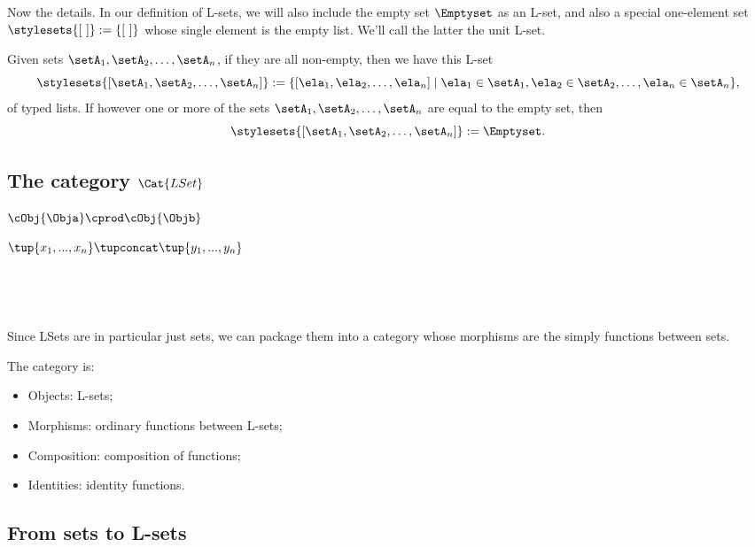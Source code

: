 Now the details.
In our definition of L-sets, we will also include the empty set $\Emptyset$ as an L-set, and also a special one-element set $\stylesets{[ \ ]} := \{ [ \ ] \}$ whose single element is the empty list.
We'll call the latter the unit L-set.

Given sets $\setA_1, \setA_2, \dots , \setA_n$, if they are all non-empty, then we have this L-set
\begin{equation}
    \stylesets{[\setA_1, \setA_2, \dots, \setA_n]} := \{ [ \ela_1, \ela_2, \dots, \ela_n] \mid \ela_1 \in \setA_1, \ela_2 \in \setA_2, \dots, \ela_n \in \setA_n \},
\end{equation}
of typed lists.
If however one or more of the sets $\setA_1, \setA_2, \dots , \setA_n$ are equal to the empty set, then \begin{equation}
    \stylesets{[\setA_1, \setA_2, \dots, \setA_n]} := \Emptyset.
\end{equation}

\subsection{The category $\Cat{LSet}$}

\cCat{\Set}

$\cObj{\Obja} \cprod \cObj{\Objb}$

$\tup{x_1, ..., x_n} \tupconcat \tup{y_1, ..., y_n}$

\

\

Since LSets are in particular just sets, we can package them into a category whose morphisms are the simply functions between sets.

\begin{ctdefinition}
    The category  is:

    \begin{itemize}
        \item Objects: L-sets;
        \item Morphisms: ordinary functions between L-sets;
        \item Composition: composition of functions;
        \item Identities: identity functions.
    \end{itemize}
\end{ctdefinition}

\subsection{From sets to L-sets}

